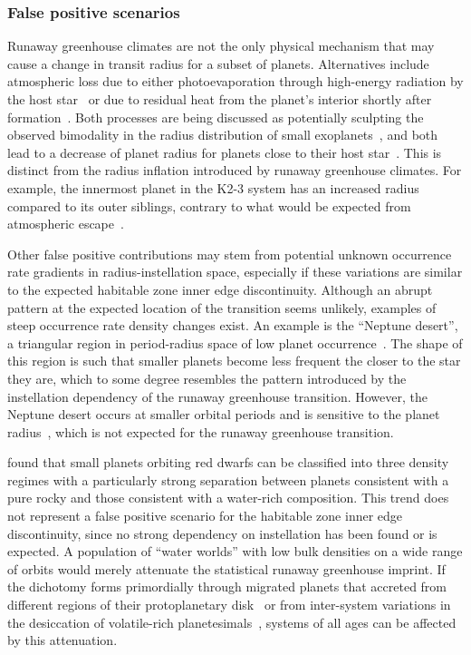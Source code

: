 \documentclass[twocolumn,twocolappendix,linenumbers]{aastex631}
\begin{document}
\subsubsection{False positive scenarios}\label{sec:dis_falsepositive}
Runaway greenhouse climates are not the only physical mechanism that may cause a change in transit radius for a subset of planets.
Alternatives include atmospheric loss due to either photoevaporation through high-energy radiation by the host star~\citep[e.g.,][]{2012ApJ...753...66I,Owen2013,Jin2014,Mordasini2020a} or due to residual heat from the planet's interior shortly after formation~\citep{Ginzburg2016b,Ginzburg2018,Gupta2019}.
Both processes are being discussed as potentially sculpting the observed bimodality in the radius distribution of small exoplanets~\citep{Fulton2017,VanEylen2018}, and both lead to a decrease of planet radius for planets close to their host star~\citep{Pascucci2019,Bergsten2022}.
This is distinct from the radius inflation introduced by runaway greenhouse climates.
For example, the innermost planet in the \mbox{K2-3} system has an increased radius compared to its outer siblings, contrary to what would be expected from atmospheric escape~\citep{2022AJ....164..172D}.

Other false positive contributions may stem from potential unknown occurrence rate gradients in radius-instellation space, especially if these variations are similar to the expected habitable zone inner edge discontinuity.
Although an abrupt pattern at the expected location of the transition seems unlikely, examples of steep occurrence rate density changes exist.
An example is the ``Neptune desert'', a triangular region in period-radius space of low planet occurrence~\citep{Szabo2011,Mazeh2016,Dreizler2020b}.
The shape of this region is such that smaller planets become less frequent the closer to the star they are, which to some degree resembles the pattern introduced by the instellation dependency of the runaway greenhouse transition.
However, the Neptune desert occurs at smaller orbital periods and is sensitive to the planet radius~\citep{Szabo2011}, which is not expected for the runaway greenhouse transition.

\citet{Luque2022} found that small planets orbiting red dwarfs can be classified into three density regimes with a particularly strong separation between planets consistent with a pure rocky and those consistent with a water-rich composition.
This trend does not represent a false positive scenario for the habitable zone inner edge discontinuity, since no strong dependency on instellation has been found or is expected.
A population of ``water worlds'' with low bulk densities on a wide range of orbits would merely attenuate the statistical runaway greenhouse imprint.
If the dichotomy forms primordially through migrated planets that accreted from different regions of their protoplanetary disk~\citep{Venturini2020,Burn2021,Schlecker2021,Schlecker2021b} or from inter-system variations in the desiccation of volatile-rich planetesimals~\citep{Lichtenberg2019,2021Sci...371..365L,2021ApJ...913L..20L,2022ApJ...938L...3L,2023NatAs...7...39B}, systems of all ages can be affected by this attenuation.
\end{document}
